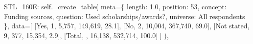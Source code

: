 \documentclass[
  11pt,
  a4paper,
]{article}
\newenvironment{Shaded}{\begin{snugshade}}{\end{snugshade}}
\newcommand{\NormalTok}[1]{\textcolor[rgb]{0.00,0.23,0.31}{#1}}
\newcommand{\OperatorTok}[1]{\textcolor[rgb]{0.37,0.37,0.37}{#1}}
\newcommand{\StringTok}[1]{\textcolor[rgb]{0.13,0.47,0.30}{#1}}
\newcommand{\VariableTok}[1]{\textcolor[rgb]{0.07,0.07,0.07}{#1}}
\begin{document}
\begin{Shaded}
\begin{Highlighting}[]
            \StringTok{\textquotesingle{}STL\_160E\textquotesingle{}}\NormalTok{: }\VariableTok{self}\NormalTok{.\_create\_table(}
\NormalTok{                meta}\OperatorTok{=}\NormalTok{\{}
                    \StringTok{\textquotesingle{}length\textquotesingle{}}\NormalTok{: }\StringTok{\textquotesingle{}1.0\textquotesingle{}}\NormalTok{, }\StringTok{\textquotesingle{}position\textquotesingle{}}\NormalTok{: }\StringTok{\textquotesingle{}53\textquotesingle{}}\NormalTok{,}
                    \StringTok{\textquotesingle{}concept\textquotesingle{}}\NormalTok{: }\StringTok{\textquotesingle{}Funding sources\textquotesingle{}}\NormalTok{,}
                    \StringTok{\textquotesingle{}question\textquotesingle{}}\NormalTok{: }\StringTok{\textquotesingle{}Used scholarships/awards?\textquotesingle{}}\NormalTok{,}
                    \StringTok{\textquotesingle{}universe\textquotesingle{}}\NormalTok{: }\StringTok{\textquotesingle{}All respondents\textquotesingle{}}
\NormalTok{                \},}
\NormalTok{                data}\OperatorTok{=}\NormalTok{[}
\NormalTok{                    [}\StringTok{\textquotesingle{}Yes\textquotesingle{}}\NormalTok{, }\StringTok{\textquotesingle{}1\textquotesingle{}}\NormalTok{, }\StringTok{\textquotesingle{}5,757\textquotesingle{}}\NormalTok{, }\StringTok{\textquotesingle{}149,619\textquotesingle{}}\NormalTok{, }\StringTok{\textquotesingle{}28.1\textquotesingle{}}\NormalTok{],}
\NormalTok{                    [}\StringTok{\textquotesingle{}No\textquotesingle{}}\NormalTok{, }\StringTok{\textquotesingle{}2\textquotesingle{}}\NormalTok{, }\StringTok{\textquotesingle{}10,004\textquotesingle{}}\NormalTok{, }\StringTok{\textquotesingle{}367,740\textquotesingle{}}\NormalTok{, }\StringTok{\textquotesingle{}69.0\textquotesingle{}}\NormalTok{],}
\NormalTok{                    [}\StringTok{\textquotesingle{}Not stated\textquotesingle{}}\NormalTok{, }\StringTok{\textquotesingle{}9\textquotesingle{}}\NormalTok{, }\StringTok{\textquotesingle{}377\textquotesingle{}}\NormalTok{, }\StringTok{\textquotesingle{}15,354\textquotesingle{}}\NormalTok{, }\StringTok{\textquotesingle{}2.9\textquotesingle{}}\NormalTok{],}
\NormalTok{                    [}\StringTok{\textquotesingle{}Total\textquotesingle{}}\NormalTok{, }\StringTok{\textquotesingle{}\textquotesingle{}}\NormalTok{, }\StringTok{\textquotesingle{}16,138\textquotesingle{}}\NormalTok{, }\StringTok{\textquotesingle{}532,714\textquotesingle{}}\NormalTok{, }\StringTok{\textquotesingle{}100.0\textquotesingle{}}\NormalTok{]}
\NormalTok{                ]}
\NormalTok{            ),}
            

\end{Highlighting}
\end{Shaded}
\end{document}
